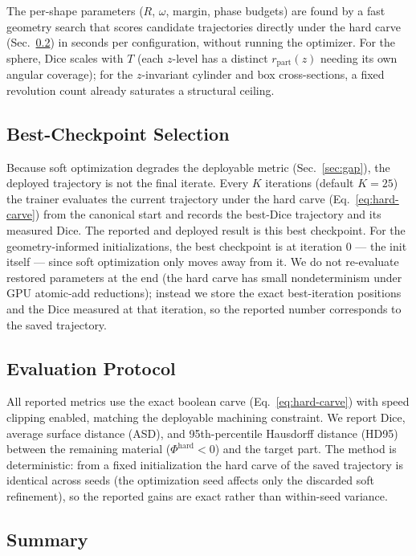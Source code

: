 The per-shape parameters ($R$, $\omega$, $\mathrm{margin}$, phase budgets) are
found by a fast geometry search that scores candidate trajectories directly
under the hard carve (Sec.~\ref{sec:eval}) in seconds per configuration, without
running the optimizer. For the sphere, Dice scales with $T$ (each $z$-level has
a distinct $r_{\mathrm{part}}(z)$ needing its own angular coverage); for the
$z$-invariant cylinder and box cross-sections, a fixed revolution count already
saturates a structural ceiling.

\subsection{Best-Checkpoint Selection}
\label{sec:checkpoint}

Because soft optimization degrades the deployable metric
(Sec.~\ref{sec:gap}), the deployed trajectory is not the final iterate. Every
$K$ iterations (default $K{=}25$) the trainer evaluates the current trajectory
under the hard carve (Eq.~\ref{eq:hard-carve}) from the canonical start and
records the best-Dice trajectory and its measured Dice. The reported and
deployed result is this best checkpoint. For the geometry-informed
initializations, the best checkpoint is at iteration $0$ --- the init itself ---
since soft optimization only moves away from it. We do not re-evaluate restored
parameters at the end (the hard carve has small nondeterminism under GPU
atomic-add reductions); instead we store the exact best-iteration positions and
the Dice measured at that iteration, so the reported number corresponds to the
saved trajectory.

\subsection{Evaluation Protocol}
\label{sec:eval}

All reported metrics use the exact boolean carve
(Eq.~\ref{eq:hard-carve}) with speed clipping enabled, matching the
deployable machining constraint. We report Dice, average surface distance (ASD),
and 95th-percentile Hausdorff distance (HD95) between the remaining material
($\Phi^{\mathrm{hard}}<0$) and the target part. The method is deterministic:
from a fixed initialization the hard carve of the saved trajectory is identical
across seeds (the optimization seed affects only the discarded soft refinement),
so the reported gains are exact rather than within-seed variance.

\subsection{Summary}
\label{sec:method-summary}

